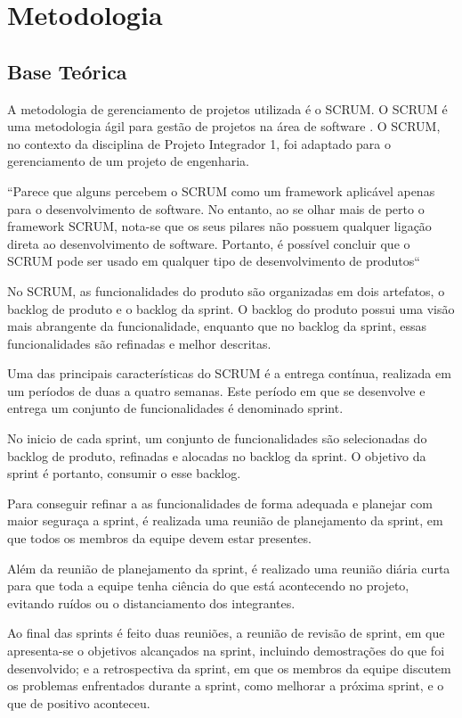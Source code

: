 \section{Metodologia}
\subsection{Base Teórica}
A metodologia de gerenciamento de projetos utilizada é o SCRUM. O SCRUM é uma metodologia ágil para gestão de projetos na área de software \cite{devagil}. O SCRUM, no contexto da disciplina de Projeto Integrador 1, foi adaptado para o gerenciamento de um projeto de engenharia.

“Parece que alguns percebem o SCRUM como um framework aplicável apenas para o desenvolvimento de software. No entanto, ao se olhar mais de perto o framework SCRUM, nota-se que os seus pilares não possuem qualquer ligação direta ao desenvolvimento de software. Portanto, é possível concluir que o SCRUM pode ser usado em qualquer tipo de desenvolvimento de produtos“ \cite{scrumineng}

No SCRUM, as funcionalidades do produto são organizadas em dois artefatos, o backlog de produto e o backlog da sprint. O backlog do produto possui uma visão mais abrangente da funcionalidade, enquanto que no backlog da sprint, essas funcionalidades são refinadas e melhor descritas.

Uma das principais características do SCRUM é a entrega contínua, realizada em um períodos de duas a quatro semanas. Este período em que se desenvolve e entrega um conjunto de funcionalidades é denominado sprint.

No inicio de cada sprint, um conjunto de funcionalidades são selecionadas do backlog de produto, refinadas e alocadas no backlog da sprint. O objetivo da sprint é portanto, consumir o esse backlog.

Para conseguir refinar a as funcionalidades de forma adequada e planejar com maior seguraça a sprint, é realizada uma reunião de planejamento da sprint, em que todos os membros da equipe devem estar presentes.

Além da reunião de planejamento da sprint, é realizado uma reunião diária curta para que toda a equipe tenha ciência do que está acontecendo no projeto, evitando ruídos ou o distanciamento dos integrantes.

Ao final das sprints é feito duas reuniões, a reunião de revisão de sprint, em que apresenta-se o objetivos alcançados na sprint, incluindo demostrações do que foi desenvolvido; e a retrospectiva da sprint, em que os membros da equipe discutem os problemas enfrentados durante a sprint, como melhorar a próxima sprint, e o que de positivo aconteceu.
